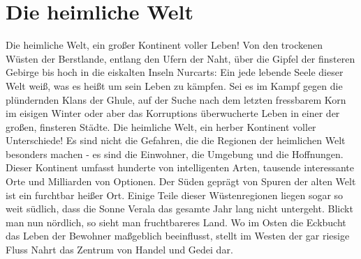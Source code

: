 \section{Die heimliche Welt}
    Die heimliche Welt, ein großer Kontinent voller Leben! Von den trockenen Wüsten der Berstlande, entlang den Ufern der Naht, über die Gipfel der finsteren Gebirge bis hoch in die eiskalten Inseln Nurcarts: Ein jede lebende Seele dieser Welt weiß, was es heißt um sein Leben zu kämpfen. Sei es im Kampf gegen die plündernden Klans der Ghule, auf der Suche nach dem letzten fressbarem Korn im eisigen Winter oder aber das Korruptions überwucherte Leben in einer der großen, finsteren Städte. 
    Die heimliche Welt, ein herber Kontinent voller Unterschiede! Es sind nicht die Gefahren, die die Regionen der heimlichen Welt besonders machen - es sind die Einwohner, die Umgebung und die Hoffnungen. Dieser Kontinent umfasst hunderte von intelligenten Arten, tausende interessante Orte und Milliarden von Optionen. Der Süden geprägt von Spuren der alten Welt ist ein furchtbar heißer Ort. Einige Teile dieser Wüstenregionen liegen sogar so weit südlich, dass die Sonne Verala das gesamte Jahr lang nicht untergeht. Blickt man nun nördlich, so sieht man fruchtbareres Land. Wo im Osten die Eckbucht das Leben der Bewohner maßgeblich beeinflusst, stellt im Westen der gar riesige Fluss Nahrt das Zentrum von Handel und Gedei dar. 
    
